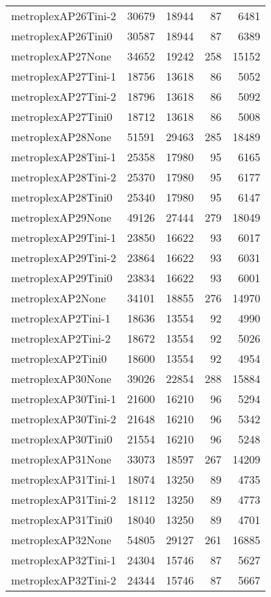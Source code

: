 \begin{longtable}{lrrrr}
metroplexAP26Tini-2 & 30679 & 18944 & 87 & 6481 \\
metroplexAP26Tini0 & 30587 & 18944 & 87 & 6389 \\
metroplexAP27None & 34652 & 19242 & 258 & 15152 \\
metroplexAP27Tini-1 & 18756 & 13618 & 86 & 5052 \\
metroplexAP27Tini-2 & 18796 & 13618 & 86 & 5092 \\
metroplexAP27Tini0 & 18712 & 13618 & 86 & 5008 \\
metroplexAP28None & 51591 & 29463 & 285 & 18489 \\
metroplexAP28Tini-1 & 25358 & 17980 & 95 & 6165 \\
metroplexAP28Tini-2 & 25370 & 17980 & 95 & 6177 \\
metroplexAP28Tini0 & 25340 & 17980 & 95 & 6147 \\
metroplexAP29None & 49126 & 27444 & 279 & 18049 \\
metroplexAP29Tini-1 & 23850 & 16622 & 93 & 6017 \\
metroplexAP29Tini-2 & 23864 & 16622 & 93 & 6031 \\
metroplexAP29Tini0 & 23834 & 16622 & 93 & 6001 \\
metroplexAP2None & 34101 & 18855 & 276 & 14970 \\
metroplexAP2Tini-1 & 18636 & 13554 & 92 & 4990 \\
metroplexAP2Tini-2 & 18672 & 13554 & 92 & 5026 \\
metroplexAP2Tini0 & 18600 & 13554 & 92 & 4954 \\
metroplexAP30None & 39026 & 22854 & 288 & 15884 \\
metroplexAP30Tini-1 & 21600 & 16210 & 96 & 5294 \\
metroplexAP30Tini-2 & 21648 & 16210 & 96 & 5342 \\
metroplexAP30Tini0 & 21554 & 16210 & 96 & 5248 \\
metroplexAP31None & 33073 & 18597 & 267 & 14209 \\
metroplexAP31Tini-1 & 18074 & 13250 & 89 & 4735 \\
metroplexAP31Tini-2 & 18112 & 13250 & 89 & 4773 \\
metroplexAP31Tini0 & 18040 & 13250 & 89 & 4701 \\
metroplexAP32None & 54805 & 29127 & 261 & 16885 \\
metroplexAP32Tini-1 & 24304 & 15746 & 87 & 5627 \\
metroplexAP32Tini-2 & 24344 & 15746 & 87 & 5667 \\

\end{longtable}
